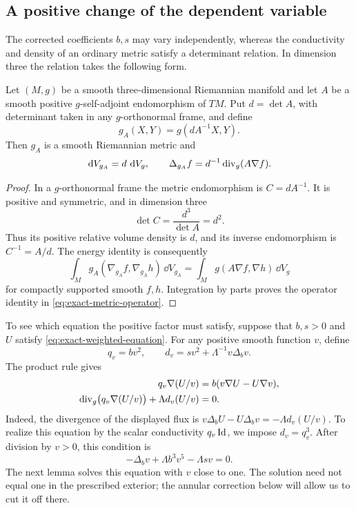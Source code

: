 \subsection{A positive change of the dependent variable}

The corrected coefficients $b,s$ may vary independently, whereas the
conductivity and density of an ordinary metric satisfy a determinant
relation.  In dimension three the relation takes the following form.

\begin{lemma}
\label{lem:metric-conductivity}
Let \((M,g)\) be a smooth three-dimensional Riemannian manifold and
let \(A\) be a smooth positive \(g\)-self-adjoint endomorphism of
\(TM\).  Put \(d=\det A\), with determinant taken in any
\(g\)-orthonormal frame, and define
\begin{equation}
 g_A(X,Y)=g(dA^{-1}X,Y).
 \label{eq:exact-metric-realization}
\end{equation}
Then \(g_A\) is a smooth Riemannian metric and
\begin{equation}
 \,\mathrm d V_{g_A}=d\,\,\mathrm d V_g,\qquad
 \Delta_{g_A}f=d^{-1}\operatorname{div}_g(A\nabla f).
 \label{eq:exact-metric-operator}
\end{equation}
\end{lemma}

\begin{proof}
In a \(g\)-orthonormal frame the metric endomorphism is
\(C=dA^{-1}\).  It is positive and symmetric, and in dimension three
\[
 \det C=\frac{d^3}{\det A}=d^2.
\]
Thus its positive relative volume density is \(d\), and its inverse
endomorphism is \(C^{-1}=A/d\).  The energy identity is consequently
\[
 \int_M g_A(\nabla_{g_A}f,\nabla_{g_A}h)\,\dd V_{g_A}
 =\int_M g(A\nabla f,\nabla h)\,\dd V_g
\]
for compactly supported smooth \(f,h\).  Integration by parts proves
the operator identity in \eqref{eq:exact-metric-operator}.
\end{proof}

To see which equation the positive factor must satisfy, suppose that
$b,s>0$ and $U$ satisfy \eqref{eq:exact-weighted-equation}.  For any
positive smooth function $v$, define
\[
 q_v=bv^2,\qquad
 d_v=sv^2+\Lambda^{-1}v\Delta_bv.
\]
The product rule gives
\begin{align}
 q_v\nabla(U/v)&=b(v\nabla U-U\nabla v),\notag\\
 \operatorname{div}_g\bigl(q_v\nabla(U/v)\bigr)+\Lambda d_v(U/v)&=0.
 \label{eq:exact-division-identity}
\end{align}
Indeed, the divergence of the displayed flux is
$v\Delta_bU-U\Delta_bv=-\Lambda d_v(U/v)$.
To realize this equation by the scalar conductivity $q_v\operatorname{Id}$, we impose
$d_v=q_v^3$.  After division by $v>0$, this condition is
\[
 -\Delta_bv+\Lambda b^3v^5-\Lambda sv=0.
\]
The next lemma solves this equation with $v$ close to one.  The solution
need not equal one in the prescribed exterior; the annular correction
below will allow us to cut it off there.

